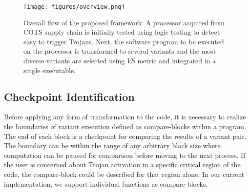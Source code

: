 \documentclass[conference]{IEEEtran}
\begin{document}
 \begin{figure}[t!]
\centerline{\texttt{[image: figures/overview.png]}}
\caption{Overall flow of the proposed framework: A processor acquired from COTS supply chain is initially tested using logic testing to detect easy to trigger Trojans. Next, the software program to be executed on the processor is transformed to several variants and the  most diverse variants are selected using $VS$ metric and integrated in a single executable. }
\label{fig:toolFlow}
\end{figure}


\subsection{Checkpoint Identification}
Before applying any form of transformation to the code, it is necessary to realize the boundaries of variant execution defined as compare-blocks within a program. The end of each block is a checkpoint for comparing the results of a variant pair. The boundary can be within the range of any arbitrary block size where computation can be paused for comparison before moving to the next process. If the user is concerned about Trojan activation in a specific critical region of the code, the compare-block could be described for that region alone. In our current implementation, we support individual functions as compare-blocks.       


\end{document}
